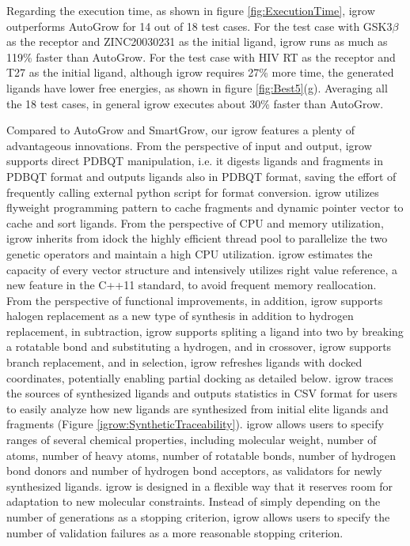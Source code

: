 \documentclass[10pt, conference, compsocconf]{IEEEtran}
\begin{document}
Regarding the execution time, as shown in figure \ref{fig:ExecutionTime}, igrow outperforms AutoGrow for 14 out of 18 test cases.
For the test case with GSK3$\beta$ as the receptor and ZINC20030231 as the initial ligand, igrow runs as much as 119\% faster than AutoGrow.
For the test case with HIV RT as the receptor and T27 as the initial ligand, although igrow requires 27\% more time, the generated ligands have lower free energies, as shown in figure \ref{fig:Best5}(g).
Averaging all the 18 test cases, in general igrow executes about 30\% faster than AutoGrow.

Compared to AutoGrow and SmartGrow, our igrow features a plenty of advantageous innovations. From the perspective of input and output, igrow supports direct PDBQT manipulation, i.e. it digests ligands and fragments in PDBQT format and outputs ligands also in PDBQT format, saving the effort of frequently calling external python script for format conversion. igrow utilizes flyweight programming pattern to cache fragments and dynamic pointer vector to cache and sort ligands. From the perspective of CPU and memory utilization, igrow inherits from idock the highly efficient thread pool to parallelize the two genetic operators and maintain a high CPU utilization. igrow estimates the capacity of every vector structure and intensively utilizes right value reference, a new feature in the C++11 standard, to avoid frequent memory reallocation. From the perspective of functional improvements, in addition, igrow supports halogen replacement as a new type of synthesis in addition to hydrogen replacement, in subtraction, igrow supports spliting a ligand into two by breaking a rotatable bond and substituting a hydrogen, and in crossover, igrow supports branch replacement, and in selection, igrow refreshes ligands with docked coordinates, potentially enabling partial docking as detailed below. igrow traces the sources of synthesized ligands and outputs statistics in CSV format for users to easily analyze how new ligands are synthesized from initial elite ligands and fragments (Figure \ref{igrow:SyntheticTraceability}). igrow allows users to specify ranges of several chemical properties, including molecular weight, number of atoms, number of heavy atoms, number of rotatable bonds, number of hydrogen bond donors and number of hydrogen bond acceptors, as validators for newly synthesized ligands. igrow is designed in a flexible way that it reserves room for adaptation to new molecular constraints. Instead of simply depending on the number of generations as a stopping criterion, igrow allows users to specify the number of validation failures as a more reasonable stopping criterion.
\end{document}
